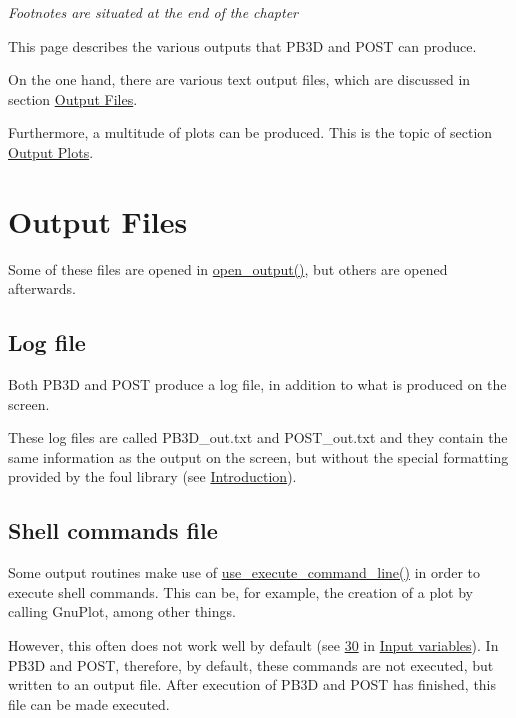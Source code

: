  
    \textit{\scriptsize Footnotes are situated at the end of the chapter}


This page describes the various outputs that P\+B3D and P\+O\+ST can produce.

On the one hand, there are various text output files, which are discussed in section \hyperlink{page_outputs_output_files}{Output Files}.

Furthermore, a multitude of plots can be produced. This is the topic of section \hyperlink{page_outputs_output_plots}{Output Plots}.\hypertarget{page_outputs_output_files}{}\section{Output Files}\label{page_outputs_output_files}
Some of these files are opened in \hyperlink{namespacefiles__ops_ad681a9e8083a6f664cf0f9d17ebe279c}{open\+\_\+output()}, but others are opened afterwards.\hypertarget{page_outputs_output_file_log}{}\subsection{Log file}\label{page_outputs_output_file_log}
Both P\+B3D and P\+O\+ST produce a log file, in addition to what is produced on the screen.

These log files are called {\ttfamily P\+B3\+D\+\_\+out.\+txt} and {\ttfamily P\+O\+S\+T\+\_\+out.\+txt} and they contain the same information as the output on the screen, but without the special formatting provided by the foul library (see \hyperlink{page_installation_installation_introduction}{Introduction}).\hypertarget{page_outputs_output_file_shell}{}\subsection{Shell commands file}\label{page_outputs_output_file_shell}
Some output routines make use of \hyperlink{namespaceoutput__ops_aa9e4855511b6ea16a08b3efb587bec51}{use\+\_\+execute\+\_\+command\+\_\+line()} in order to execute shell commands. This can be, for example, the creation of a plot by calling Gnu\+Plot, among other things.

However, this often does not work well by default (see \hyperlink{page_inputs_fni30}{30} in \hyperlink{page_inputs}{Input variables}). In P\+B3D and P\+O\+ST, therefore, by default, these commands are not executed, but written to an output file. After execution of P\+B3D and P\+O\+ST has finished, this file can be made executed.

